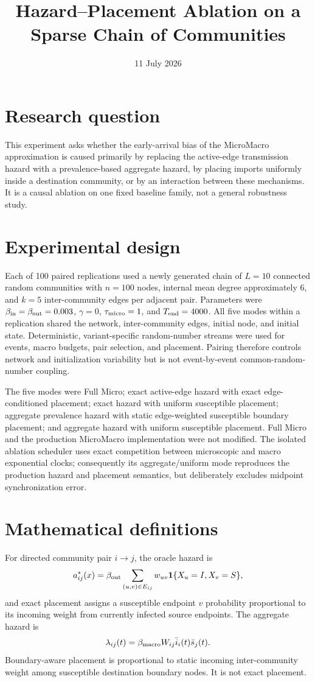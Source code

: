 \documentclass[11pt]{article}
\title{Hazard--Placement Ablation on a Sparse Chain of Communities}
\author{}
\date{11 July 2026}
\begin{document}
\maketitle

\section{Research question}
This experiment asks whether the early-arrival bias of the MicroMacro approximation is caused primarily by replacing the active-edge transmission hazard with a prevalence-based aggregate hazard, by placing imports uniformly inside a destination community, or by an interaction between these mechanisms. It is a causal ablation on one fixed baseline family, not a general robustness study.

\section{Experimental design}
Each of 100 paired replications used a newly generated chain of $L=10$ connected random communities with $n=100$ nodes, internal mean degree approximately $6$, and $k=5$ inter-community edges per adjacent pair. Parameters were $\beta_{\rm in}=\beta_{\rm out}=0.003$, $\gamma=0$, $\tau_{\rm micro}=1$, and $T_{\rm end}=4000$. All five modes within a replication shared the network, inter-community edges, initial node, and initial state. Deterministic, variant-specific random-number streams were used for events, macro budgets, pair selection, and placement. Pairing therefore controls network and initialization variability but is not event-by-event common-random-number coupling.

The five modes were Full Micro; exact active-edge hazard with exact edge-conditioned placement; exact hazard with uniform susceptible placement; aggregate prevalence hazard with static edge-weighted susceptible boundary placement; and aggregate hazard with uniform susceptible placement. Full Micro and the production MicroMacro implementation were not modified. The isolated ablation scheduler uses exact competition between microscopic and macro exponential clocks; consequently its aggregate/uniform mode reproduces the production hazard and placement semantics, but deliberately excludes midpoint synchronization error.

\section{Mathematical definitions}
For directed community pair $i\to j$, the oracle hazard is
\[
a^*_{ij}(x)=\beta_{\rm out}\sum_{(u,v)\in E_{ij}}w_{uv}
\mathbf{1}\{X_u=I,X_v=S\},
\]
and exact placement assigns a susceptible endpoint $v$ probability proportional to its incoming weight from currently infected source endpoints. The aggregate hazard is
\[
\lambda_{ij}(t)=\beta_{\rm macro}W_{ij}\bar i_i(t)\bar s_j(t).
\]
Boundary-aware placement is proportional to static incoming inter-community weight among susceptible destination boundary nodes. It is not exact placement.
\end{document}
